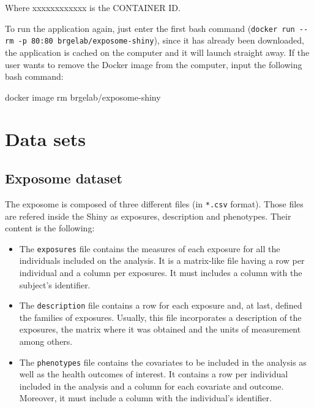 \documentclass[
]{book}
\newenvironment{Shaded}{\begin{snugshade}}{\end{snugshade}}
\newcommand{\ExtensionTok}[1]{#1}
\newcommand{\NormalTok}[1]{#1}
\providecommand{\tightlist}{%
  \setlength{\itemsep}{0pt}\setlength{\parskip}{0pt}}
\begin{document}
Where xxxxxxxxxxxx is the CONTAINER ID.

To run the application again, just enter the first bash command (\texttt{docker\ run\ -\/-rm\ -p\ 80:80\ brgelab/exposome-shiny}), since it has already been downloaded, the application is cached on the computer and it will launch straight away. If the user wants to remove the Docker image from the computer, input the following bash command:

\begin{Shaded}
\begin{Highlighting}[]
\ExtensionTok{docker}\NormalTok{ image rm brgelab/exposome{-}shiny}
\end{Highlighting}
\end{Shaded}

\hypertarget{data-sets}{%
\chapter{Data sets}\label{data-sets}}

\hypertarget{exposome-dataset}{%
\section{Exposome dataset}\label{exposome-dataset}}

The exposome is composed of three different files (in \texttt{*.csv} format). Those files are refered inside the Shiny as exposures, description and phenotypes. Their content is the following:

\begin{itemize}
\tightlist
\item
  The \texttt{exposures} file contains the measures of each exposure for all the individuals included on the analysis. It is a matrix-like file having a row per individual and a column per exposures. It must includes a column with the subject's identifier.
\item
  The \texttt{description} file contains a row for each exposure and, at last, defined the families of exposures. Usually, this file incorporates a description of the exposures, the matrix where it was obtained and the units of measurement among others.
\item
  The \texttt{phenotypes} file contains the covariates to be included in the analysis as well as the health outcomes of interest. It contains a row per individual included in the analysis and a column for each covariate and outcome. Moreover, it must include a column with the individual's identifier.
\end{itemize}
\end{document}

